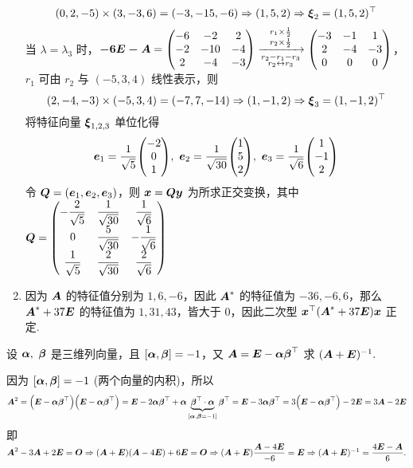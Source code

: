 \begin{solution}
\begin{enumerate}[label=(\arabic{*})]
              $$(0,2,-5)\times(3,-3,6)=(-3,-15,-6)\Rightarrow(1,5,2)\Rightarrow \vb*{\xi}_2=(1,5,2)^\top$$
              当 $\lambda=\lambda_3$ 时，$\vb*{-6\vb*{E}-\vb*{A}}=\mqty(-6&-2&2\\-2&-10&-4\\2&-4&-3)\xrightarrow[\substack{r_2-r_1-r_3\\r_2\leftrightarrow r_3}]{\substack{r_1\times\frac{1}{2}\\r_2\times\frac{1}{2}}}\mqty(-3&-1&1\\2&-4&-3\\0&0&0)$，$r_1$ 可由 $r_2$ 与 $(-5,3,4)$ 线性表示，则
              $$(2,-4,-3)\times(-5,3,4)=(-7,7,-14)\Rightarrow (1,-1,2)\Rightarrow \vb*{\xi}_3=(1,-1,2)^\top$$
              将特征向量 $\vb*{\xi}_{1,2,3}$ 单位化得
              $$\vb*{e}_1=\dfrac{1}{\sqrt{5}}\mqty(-2\\0\\1),~\vb*{e}_2=\dfrac{1}{\sqrt{30}}\mqty(1\\5\\2),~\vb*{e}_3=\dfrac{1}{\sqrt{6}}\mqty(1\\-1\\2)$$
              令 $\vb*{Q}=(\vb*{e}_1,\vb*{e}_2,\vb*{e}_3)$，则 $\vb*{x}=\vb*{Qy}$ 为所求正交变换，其中 $\vb*{Q}=\mqty(-\dfrac{2}{\sqrt{5}}&\dfrac{1}{\sqrt{30}}&\dfrac{1}{\sqrt{6}}\\[6pt]0&\dfrac{5}{\sqrt{30}}&-\dfrac{1}{\sqrt{6}}\\[6pt]\dfrac{1}{\sqrt{5}}&\dfrac{2}{\sqrt{30}}&\dfrac{2}{\sqrt{6}})$
        \item 因为 $\vb*{A}$ 的特征值分别为 $1,6,-6$，因此 $\vb*{A}^*$ 的特征值为 $-36,-6,6$，那么 $\vb*{A}^*+37\vb*{E}$ 的特征值为 $1,31,43$，皆大于 0，因此二次型 $\vb*{x}^\top\qty(\vb*{A}^*+37\vb*{E})\vb*{x}$ 正定.
    \end{enumerate}
\end{solution}

\begin{example}
    设 $\vb*{\alpha},~\vb*{\beta}$ 是三维列向量，且 $[\vb*{\alpha},\vb*{\beta}]=-1$，又 $\vb*{A}=\vb*{E}-\vb*{\alpha\beta}^\top$ 求 $(\vb*{A}+\vb*{E})^{-1}.$
\end{example}
\begin{solution}
    因为 $[\vb*{\alpha},\vb*{\beta}]=-1$ (两个向量的内积)，所以
    $$\vb*{A}^2=\qty(\vb*{E}-\vb*{\alpha\beta}^\top)\qty(\vb*{E}-\vb*{\alpha\beta}^\top)=\vb*{E}-2\vb*{\alpha\beta}^\top+\vb*{\alpha}\underbrace{\vb*{\beta}^\top\cdot\vb*{\alpha}}_{[\vb*{\alpha},\vb*{\beta}=-1]}\vb*{\beta}^\top=\vb*{E}-3\vb*{\alpha\beta}^\top=3\qty(\vb*{E}-\vb*{\alpha\beta}^\top)-2\vb*{E}=3\vb*{A}-2\vb*{E}$$
    即 $\vb*{A}^2-3\vb*{A}+2\vb*{E}=\vb*{O}\Rightarrow (\vb*{A}+\vb*{E})(\vb*{A}-4\vb*{E})+6\vb*{E}=\vb*{O}\Rightarrow (\vb*{A}+\vb*{E})\dfrac{\vb*{A}-4\vb*{E}}{-6}=\vb*{E}\Rightarrow (\vb*{A}+\vb*{E})^{-1}=\dfrac{4\vb*{E}-\vb*{A}}{6}.$
\end{solution}


